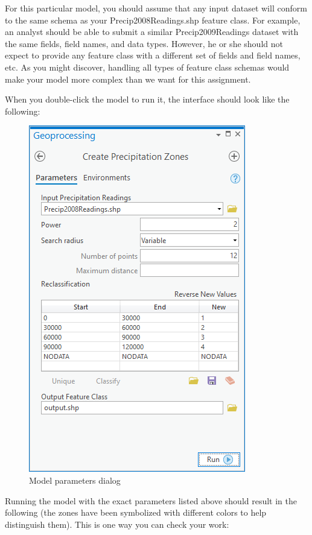 \documentclass[]{article}
\begin{document}
For this particular model, you should assume that any input dataset will
conform to the same schema as your Precip2008Readings.shp feature class.
For example, an analyst should be able to submit a similar
Precip2009Readings dataset with the same fields, field names, and data
types. However, he or she should not expect to provide any feature class
with a different set of fields and field names, etc. As you might
discover, handling all types of feature class schemas would make your
model more complex than we want for this assignment.

When you double-click the model to run it, the interface should look
like the following:

\begin{figure}
\centering
\includegraphics{./labs/images/create_precip_zones_ui_pro_0.png}
\caption{Model parameters dialog}
\end{figure}

Running the model with the exact parameters listed above should result
in the following (the zones have been symbolized with different colors
to help distinguish them). This is one way you can check your work:
\end{document}
